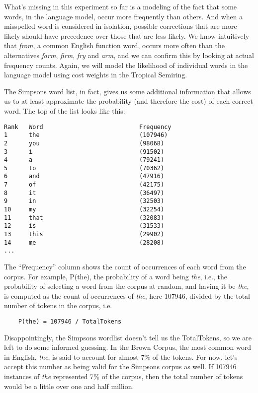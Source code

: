 What's missing in this experiment so far is a modeling of the fact that some
words, in the language model, occur more frequently than others.  And when a
misspelled word is considered in isolation, possible corrections that are more
likely should have precedence over those that are less likely.  We
know intuitively that \emph{from}, a common English function word, occurs more often than the
alternatives \emph{farm}, \emph{firm}, \emph{fry} and \emph{arm},  and we can confirm this by looking at actual frequency counts.  Again, we will
model the likelihood of individual words in the language model using cost weights in the Tropical Semiring.


The Simpsons word list, in fact, gives us some additional information that allows
us to at least approximate the probability (and therefore the cost) of each
correct word.  The top of the list looks like this:

\begin{Verbatim}
Rank   Word                           Frequency
1      the                            (107946)
2      you                            (98068)
3      i                              (91502)
4      a                              (79241)
5      to                             (70362)
6      and                            (47916)
7      of                             (42175)
8      it                             (36497)
9      in                             (32503)
10     my                             (32254)
11     that                           (32083)
12     is                             (31533)
13     this                           (29902)
14     me                             (28208)
...
\end{Verbatim}

\noindent
The ``Frequency'' column shows the count of occurrences of each word from the
corpus.  For example, P(the), the probability of a word being \emph{the}, i.e., the probability of
selecting a word from the corpus at random, and having it be \emph{the}, is
computed as the count of occurrences of \emph{the}, here 107946, divided by the
total number of tokens in the corpus, i.e.\@

\begin{Verbatim}
	P(the) = 107946 / TotalTokens
\end{Verbatim}

\noindent
Disappointingly, the Simpsons wordlist doesn't tell us the TotalTokens,
so we are left to do some informed guessing.  In the Brown Corpus, the
most common word in English, 
\emph{the}, is said to account for almost 7\% of the tokens.  For now, let's accept
this number as being valid for the Simpsons corpus as well.  If 107946 instances of \emph{the}
represented 7\% of the corpus, then the total number of tokens would be a little over one and half
million.

